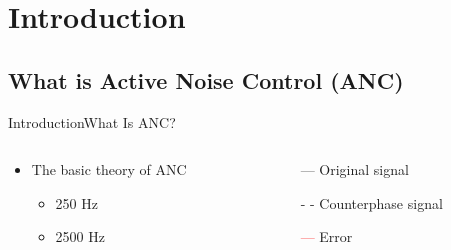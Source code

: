 \section{Introduction}
\subsection{What is Active Noise Control (ANC)}
\begin{frame}{Introduction}{What Is ANC?}		
	\begin{columns}
		\begin{column}{0.5\textwidth}
				\begin{itemize}
					\item The basic theory of ANC
					\begin{itemize}
						\item  250 Hz
						\item 2500 Hz 
					\end{itemize}	
				\end{itemize}
			\vspace{-2.5mm}	
		\begin{center}
	 		
	 	\end{center}
		\end{column}
		\begin{column}{0.5\textwidth} 
			\begin{itemize}
				\item[\textcolor{MATLABblue}{---}] Original signal
				\item[\textcolor{MATLABblue}{- -}] Counterphase signal
				\item[\textcolor{red}{---}] Error
			\end{itemize}
		\begin{center}
	 		
	 	\end{center}
		\end{column}
	\end{columns}
\end{frame}





